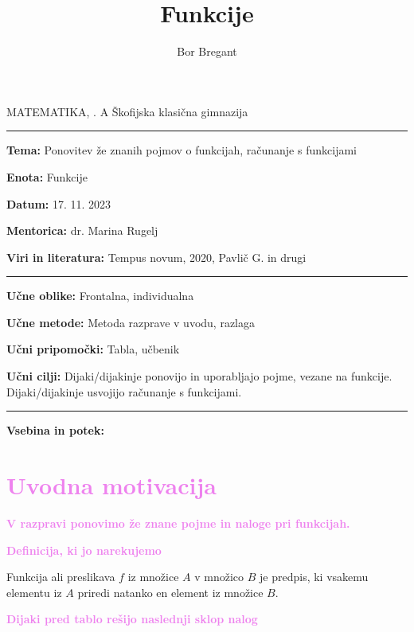 \documentclass{article}
\title{Funkcije}
\author{Bor Bregant}
\date{\vspace{-5ex}}
\begin{document}
\thispagestyle{empty}	%

\noindent MATEMATIKA, . A \hfill Škofijska klasična gimnazija
\hrule
\vspace{1ex}
\noindent \textbf{Tema:} Ponovitev že znanih pojmov o funkcijah, računanje s funkcijami
\vspace{1ex}

\noindent \textbf{Enota:} Funkcije
\vspace{1ex}

\noindent \textbf{Datum:} 17. 11. 2023
\vspace{1ex}

\noindent \textbf{Mentorica:} dr. Marina Rugelj
\vspace{1ex}

\noindent \textbf{Viri in literatura:} Tempus novum, 2020, Pavlič G. in drugi
\vspace{1ex}
\hrule
\vspace{2ex}
\noindent \textbf{Učne oblike:} Frontalna, individualna
\vspace{1ex}

\noindent \textbf{Učne metode:} Metoda razprave v uvodu, razlaga
\vspace{1ex}

\noindent \textbf{Učni pripomočki:} Tabla, učbenik
\vspace{1ex}

\noindent \textbf{Učni cilji:} Dijaki/dijakinje ponovijo in uporabljajo pojme, vezane na funkcije. Dijaki/dijakinje usvojijo računanje s funkcijami.
\vspace{4ex}
\hrule
\vspace{5ex}
\noindent \textbf{Vsebina in potek:} 

\vspace{5ex}

\section*{\textcolor{violet}{Uvodna motivacija}}

\textbf{\textcolor{violet}{V razpravi ponovimo že znane pojme in naloge pri funkcijah.}}


\textbf{\textcolor{violet}{Definicija, ki jo narekujemo}}

Funkcija ali preslikava $f$ iz množice $A$ v množico $B$ je predpis, ki vsakemu elementu iz $A$ priredi natanko en element iz množice $B$.

\textbf{\textcolor{violet}{Dijaki pred tablo rešijo naslednji sklop nalog}}
\end{document}
